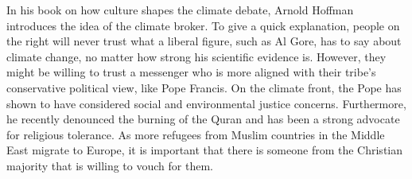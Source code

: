 \documentclass[12pt,letterpaper]{article}
\begin{document}
\begin{flushleft}
In his book on how culture shapes the climate debate, Arnold Hoffman introduces the idea of the climate broker. \autocite{hoffmann_how_nodate} To give a quick explanation, people on the right will never trust what a liberal figure, such as Al Gore, has to say about climate change, no matter how strong his scientific evidence is. However, they might be willing to trust a messenger who is more aligned with their tribe's conservative political view, like Pope Francis. On the climate front, the Pope has shown to have considered social and environmental justice concerns. Furthermore, he recently denounced the burning of the Quran and has been a strong advocate for religious tolerance. \autocite{noauthor_outcry_nodate} As more refugees from Muslim countries in the Middle East migrate to Europe, it is important that there is someone from the Christian majority that is willing to vouch for them.




\newpage

\printbibliography


\end{flushleft}
\end{document}

